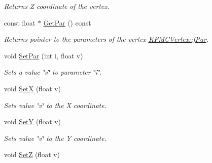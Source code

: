 \begin{DoxyCompactItemize}
\begin{DoxyCompactList}\small\item\em Returns Z coordinate of the vertex. \end{DoxyCompactList}\item 
const float $\ast$ \hyperlink{classKFMCVertex_ad2c78d7fd510edd7fc1f324442c9113c}{Get\+Par} () const \hypertarget{classKFMCVertex_ad2c78d7fd510edd7fc1f324442c9113c}{}\label{classKFMCVertex_ad2c78d7fd510edd7fc1f324442c9113c}

\begin{DoxyCompactList}\small\item\em Returns pointer to the parameters of the vertex \hyperlink{classKFMCVertex_a647ebd7994aa422d5455a3f66d9bbff9}{K\+F\+M\+C\+Vertex\+::f\+Par}. \end{DoxyCompactList}\item 
void \hyperlink{classKFMCVertex_a1e0ca1d5921cfdfcb071beae4b0492e4}{Set\+Par} (int i, float v)\hypertarget{classKFMCVertex_a1e0ca1d5921cfdfcb071beae4b0492e4}{}\label{classKFMCVertex_a1e0ca1d5921cfdfcb071beae4b0492e4}

\begin{DoxyCompactList}\small\item\em Sets a value \char`\"{}v\char`\"{} to parameter \char`\"{}i\char`\"{}. \end{DoxyCompactList}\item 
void \hyperlink{classKFMCVertex_a99b92b21117ac6047417327aaad2416a}{SetX} (float v)\hypertarget{classKFMCVertex_a99b92b21117ac6047417327aaad2416a}{}\label{classKFMCVertex_a99b92b21117ac6047417327aaad2416a}

\begin{DoxyCompactList}\small\item\em Sets value \char`\"{}v\char`\"{} to the X coordinate. \end{DoxyCompactList}\item 
void \hyperlink{classKFMCVertex_ae7eee5e4a16ca88f8da3fab3b307142b}{SetY} (float v)\hypertarget{classKFMCVertex_ae7eee5e4a16ca88f8da3fab3b307142b}{}\label{classKFMCVertex_ae7eee5e4a16ca88f8da3fab3b307142b}

\begin{DoxyCompactList}\small\item\em Sets value \char`\"{}v\char`\"{} to the Y coordinate. \end{DoxyCompactList}\item 
void \hyperlink{classKFMCVertex_a93f5b783902d6a8d244c06ddcc189967}{SetZ} (float v)\hypertarget{classKFMCVertex_a93f5b783902d6a8d244c06ddcc189967}{}\label{classKFMCVertex_a93f5b783902d6a8d244c06ddcc189967}


\end{DoxyCompactItemize}
